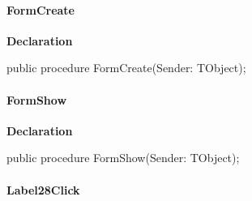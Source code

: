 \documentclass{report}
\newif\ifpdf
\begin{document}
\paragraph*{FormCreate}\hspace*{\fill}

\label{prjwizard.TfrmProjectWizard-FormCreate}
\begin{list}{}{
\setlength{\itemindent}{0cm}
\setlength{\listparindent}{0cm}
\setlength{\leftmargin}{\evensidemargin}
\addtolength{\leftmargin}{\tmplength}
\settowidth{\labelsep}{X}
\addtolength{\leftmargin}{\labelsep}
\setlength{\labelwidth}{\tmplength}
}
\item[\textbf{Declaration}\hfill]
\ifpdf
\begin{flushleft}
\fi
\begin{ttfamily}
public procedure FormCreate(Sender: TObject);\end{ttfamily}

\ifpdf
\end{flushleft}
\fi

\end{list}
\paragraph*{FormShow}\hspace*{\fill}

\label{prjwizard.TfrmProjectWizard-FormShow}
\begin{list}{}{
\setlength{\itemindent}{0cm}
\setlength{\listparindent}{0cm}
\setlength{\leftmargin}{\evensidemargin}
\addtolength{\leftmargin}{\tmplength}
\settowidth{\labelsep}{X}
\addtolength{\leftmargin}{\labelsep}
\setlength{\labelwidth}{\tmplength}
}
\item[\textbf{Declaration}\hfill]
\ifpdf
\begin{flushleft}
\fi
\begin{ttfamily}
public procedure FormShow(Sender: TObject);\end{ttfamily}

\ifpdf
\end{flushleft}
\fi

\end{list}
\paragraph*{Label28Click}\hspace*{\fill}
\end{document}
